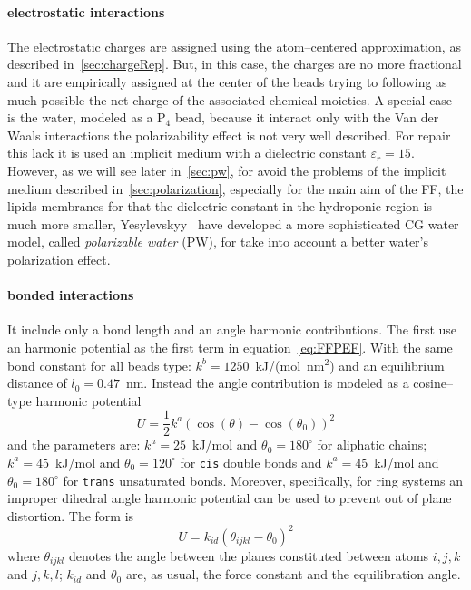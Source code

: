 \paragraph{\textbf{electrostatic interactions}} The electrostatic charges are assigned using the atom--centered approximation, as described in~\ref{sec:chargeRep}. But, in this case, the charges are no more fractional and it are empirically assigned at the center of the beads trying to following as much possible the net charge of the associated chemical moieties. A special case is the water, modeled as a P$_4$ bead, because it interact only with the Van der Waals interactions the polarizability effect is not very well described. For repair this lack it is used an implicit medium with a dielectric constant $\varepsilon_r = 15$. However, as we will see later in~\ref{sec:pw}, for avoid the problems of the implicit medium described in~\ref{sec:polarization}, especially for the main aim of the \martini \ac{FF}, the lipids membranes for that the dielectric constant in the hydroponic region is much more smaller, Yesylevskyy \etal\, \cite{PW} have developed a more sophisticated \ac{CG} water model, called \textit{polarizable water} (\acs{PW}), for take into account a better water's polarization effect.

\paragraph{\textbf{bonded interactions}} It include only a bond length and an angle harmonic contributions. The first use an harmonic potential as the first term in equation~\eqref{eq:FFPEF}. With the same bond constant for all beads type: $k^b = 1250$~kJ/(mol\ nm$^2$) and an equilibrium distance of $l_0 = 0.47$~nm. Instead the angle contribution is modeled as a cosine--type harmonic potential
\begin{equation*}
	U = \frac{1}{2}k^a (\cos(\theta) - \cos(\theta_0))^2
\end{equation*}
and the parameters are: $k^a = 25$~kJ/mol and $\theta_0 = 180^\circ$ for aliphatic chains; $k^a = 45$~kJ/mol and $\theta_0 = 120^\circ$ for \texttt{cis} double bonds and $k^a = 45$~kJ/mol and $\theta_0 = 180^\circ$ for \texttt{trans} unsaturated bonds. Moreover, specifically, for ring systems an improper dihedral angle harmonic potential can be used to prevent out of plane distortion. The form is
\begin{equation*}
	U = k_{id} (\theta_{ijkl} - \theta_0)^2
\end{equation*}
where $\theta_{ijkl}$ denotes the angle between the planes constituted between atoms $i,j,k$ and $j,k,l$; $k_{id}$ and $\theta_0$ are, as usual, the force constant and the equilibration angle.

